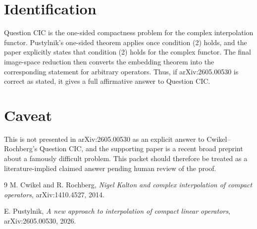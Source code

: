 \documentclass[11pt]{article}
\begin{document}
\section*{Identification}

Question CIC is the one-sided compactness problem for the complex interpolation functor. Pustylnik's one-sided theorem applies once condition (2) holds, and the paper explicitly states that condition (2) holds for the complex functor. The final image-space reduction then converts the embedding theorem into the corresponding statement for arbitrary operators. Thus, if arXiv:2605.00530 is correct as stated, it gives a full affirmative answer to Question CIC.

\section*{Caveat}

This is not presented in arXiv:2605.00530 as an explicit answer to Cwikel--Rochberg's Question CIC, and the supporting paper is a recent broad preprint about a famously difficult problem. This packet should therefore be treated as a literature-implied claimed answer pending human review of the proof.

\begin{thebibliography}{9}
M. Cwikel and R. Rochberg,
\emph{Nigel Kalton and complex interpolation of compact operators},
arXiv:1410.4527, 2014.

E. Pustylnik,
\emph{A new approach to interpolation of compact linear operators},
arXiv:2605.00530, 2026.
\end{thebibliography}
\end{document}
